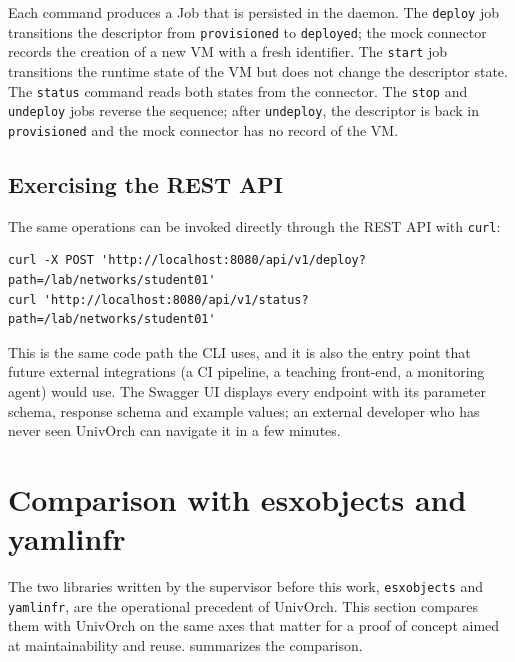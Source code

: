 Each command produces a Job that is persisted in the daemon. The
\texttt{deploy} job transitions the descriptor from
\texttt{provisioned} to \texttt{deployed}; the mock connector
records the creation of a new VM with a fresh identifier. The
\texttt{start} job transitions the runtime state of the VM but
does not change the descriptor state. The \texttt{status} command
reads both states from the connector. The \texttt{stop} and
\texttt{undeploy} jobs reverse the sequence; after
\texttt{undeploy}, the descriptor is back in \texttt{provisioned}
and the mock connector has no record of the VM.

\subsection{Exercising the REST API}

The same operations can be invoked directly through the REST API
with \texttt{curl}:

\begin{verbatim}
curl -X POST 'http://localhost:8080/api/v1/deploy?path=/lab/networks/student01'
curl 'http://localhost:8080/api/v1/status?path=/lab/networks/student01'
\end{verbatim}

This is the same code path the CLI uses, and it is also the entry
point that future external integrations (a CI pipeline, a teaching
front-end, a monitoring agent) would use. The Swagger UI displays
every endpoint with its parameter schema, response schema and
example values; an external developer who has never seen UnivOrch
can navigate it in a few minutes.

\section{Comparison with esxobjects and yamlinfr}
\label{sec:comparativa}

The two libraries written by the supervisor before this work,
\texttt{esxobjects} and \texttt{yamlinfr}, are the operational
precedent of UnivOrch. This section compares them with UnivOrch on
the same axes that matter for a proof of concept aimed at
maintainability and reuse.  summarizes the
comparison.

